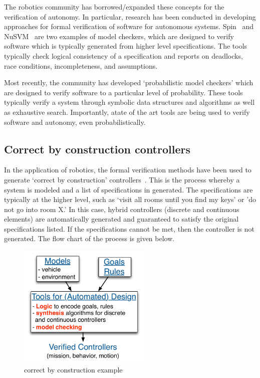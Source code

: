 The robotics community has borrowed/expanded these concepts for the verification of autonomy. In particular, research has been conducted in developing approaches for formal verification of software for autonomous systems. Spin~\cite{spin} and NuSVM~\cite{nusvm} are two examples of model checkers, which are designed to verify software which is typically generated from higher level specifications. The tools typically check logical consistency of a specification and reports on deadlocks, race conditions, incompleteness, and  assumptions. 

Most recently, the community has developed `probabilistic model checkers' which are designed to verify software to a particular level of probability. These tools typically verify a system through symbolic data structures and algorithms as well as exhaustive search. Importantly, atate of the art tools are being used to verify software and autonomy, even probabilistically.

\subsection*{Correct by construction controllers}

In the application of robotics, the formal verification methods have been used to generate `correct by construction' controllers~\cite{kress2009temporal}. This is the process whereby a system is modeled and a list of specifications in generated. The specifications are typically at the higher level, such as `visit all rooms until you find my keys' or 'do not go into room X.' In this case, hybrid controllers (discrete and continuous elements) are automatically generated and guaranteed to satisfy the original specifications listed. If the specifications cannot be met, then the controller is not generated. The flow chart of the process is given below. 

\begin{figure}[h] 
\centering
   \includegraphics[width=2.5in]{correct-by-construction.pdf} 
   \caption{correct by construction example}
   \label{fig:correct-by-construction}
\end{figure}

